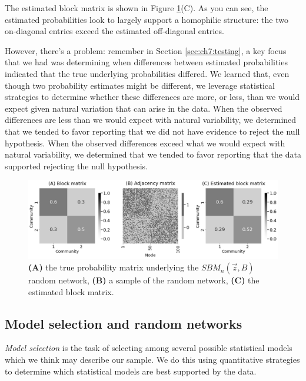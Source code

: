 The estimated block matrix is shown in Figure \ref{fig:ch7:model:ex}(C). As you can see, the estimated probabilities look to largely support a homophilic structure: the two on-diagonal entries exceed the estimated off-diagonal entries. 

However, there's a problem: remember in Section \ref{sec:ch7:testing}, a key focus that we had was determining when differences between estimated probabilities indicated that the true underlying probabilities differed. We learned that, even though two probability estimates might be different, we leverage statistical strategies to determine whether these differences are more, or less, than we would expect given natural variation that can arise in the data. When the observed differences are less than we would expect with natural variability, we determined that we tended to favor reporting that we did not have evidence to reject the null hypothesis. When the observed differences exceed what we would expect with natural variability, we determined that we tended to favor reporting that the data supported rejecting the null hypothesis.

\begin{figure}[h]
    \centering
    \includegraphics[width=\linewidth]{applications/ch7/Images/model_select_ex.png}
    \caption{\textbf{(A)} the true probability matrix underlying the $SBM_n(\vec z, B)$ random network, \textbf{(B)} a sample of the random network, \textbf{(C)} the estimated block matrix.}
    \label{fig:ch7:model:ex}
\end{figure}

\subsection{Model selection and random networks}

\textit{Model selection} is the task of selecting among several possible statistical models which we think may describe our sample. We do this using quantitative strategies to determine which statistical models are best supported by the data. 

